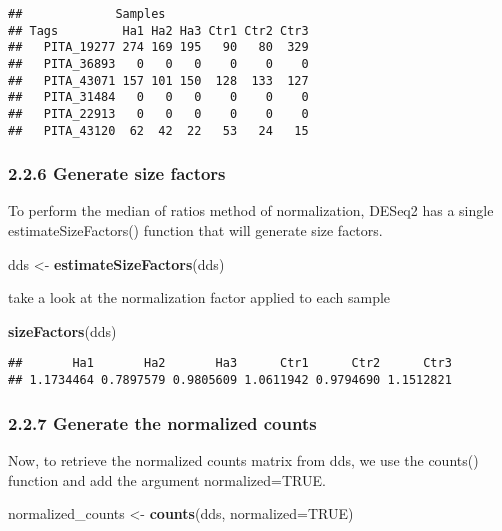 \documentclass[
]{article}
\newenvironment{Shaded}{\begin{snugshade}}{\end{snugshade}}
\newcommand{\AttributeTok}[1]{\textcolor[rgb]{0.13,0.29,0.53}{#1}}
\newcommand{\ConstantTok}[1]{\textcolor[rgb]{0.56,0.35,0.01}{#1}}
\newcommand{\FunctionTok}[1]{\textcolor[rgb]{0.13,0.29,0.53}{\textbf{#1}}}
\newcommand{\NormalTok}[1]{#1}
\newcommand{\OtherTok}[1]{\textcolor[rgb]{0.56,0.35,0.01}{#1}}
\begin{document}
\begin{verbatim}
##             Samples
## Tags         Ha1 Ha2 Ha3 Ctr1 Ctr2 Ctr3
##   PITA_19277 274 169 195   90   80  329
##   PITA_36893   0   0   0    0    0    0
##   PITA_43071 157 101 150  128  133  127
##   PITA_31484   0   0   0    0    0    0
##   PITA_22913   0   0   0    0    0    0
##   PITA_43120  62  42  22   53   24   15
\end{verbatim}

\subsubsection{2.2.6 Generate size factors}\label{generate-size-factors}

To perform the median of ratios method of normalization, DESeq2 has a
single estimateSizeFactors() function that will generate size factors.

\begin{Shaded}
\begin{Highlighting}[]
\NormalTok{dds }\OtherTok{\textless{}{-}} \FunctionTok{estimateSizeFactors}\NormalTok{(dds)}
\end{Highlighting}
\end{Shaded}

take a look at the normalization factor applied to each sample

\begin{Shaded}
\begin{Highlighting}[]
\FunctionTok{sizeFactors}\NormalTok{(dds)}
\end{Highlighting}
\end{Shaded}

\begin{verbatim}
##       Ha1       Ha2       Ha3      Ctr1      Ctr2      Ctr3 
## 1.1734464 0.7897579 0.9805609 1.0611942 0.9794690 1.1512821
\end{verbatim}

\subsubsection{2.2.7 Generate the normalized
counts}\label{generate-the-normalized-counts}

Now, to retrieve the normalized counts matrix from dds, we use the
counts() function and add the argument normalized=TRUE.

\begin{Shaded}
\begin{Highlighting}[]
\NormalTok{normalized\_counts }\OtherTok{\textless{}{-}} \FunctionTok{counts}\NormalTok{(dds, }\AttributeTok{normalized=}\ConstantTok{TRUE}\NormalTok{)}
\end{Highlighting}
\end{Shaded}
\end{document}
